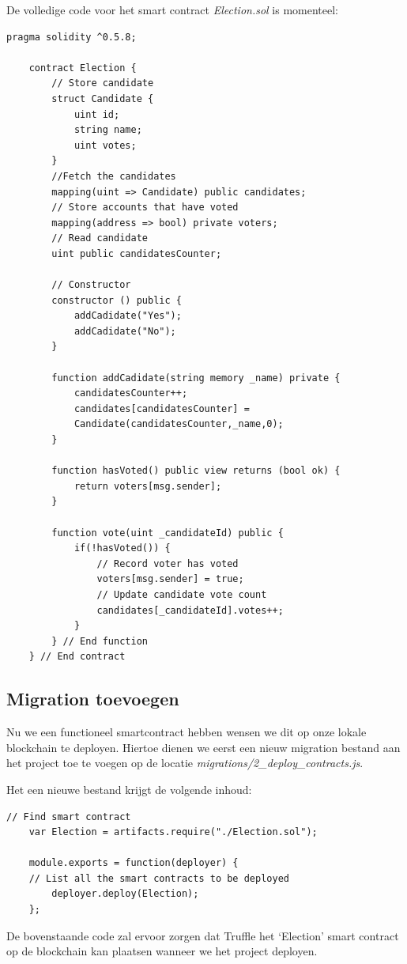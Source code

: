 	De volledige code voor het smart contract \textit{Election.sol} is momenteel:
	
	\lstset{language=JavaScriptSolidity} 
	\begin{lstlisting}[frame=single,  label={lst:election}] 
	pragma solidity ^0.5.8;
	
	contract Election {
		// Store candidate
		struct Candidate {
			uint id;
			string name;
			uint votes;
		}
		//Fetch the candidates
		mapping(uint => Candidate) public candidates;
		// Store accounts that have voted
		mapping(address => bool) private voters;
		// Read candidate
		uint public candidatesCounter;
		
		// Constructor
		constructor () public {
			addCadidate("Yes");
			addCadidate("No");
		}
	
		function addCadidate(string memory _name) private {
			candidatesCounter++;
			candidates[candidatesCounter] = 
			Candidate(candidatesCounter,_name,0);
		}
		
		function hasVoted() public view returns (bool ok) {
			return voters[msg.sender];
		}
		
		function vote(uint _candidateId) public {
			if(!hasVoted()) {
				// Record voter has voted
				voters[msg.sender] = true;
				// Update candidate vote count
				candidates[_candidateId].votes++;
			}
		} // End function
	} // End contract
	\end{lstlisting}
	
	
	\subsection{Migration toevoegen}
	Nu we een functioneel smartcontract hebben wensen we dit op onze lokale blockchain te deployen. Hiertoe dienen we  eerst een nieuw migration bestand aan het project toe te voegen op de locatie \textit{migrations\slash 2\_deploy\_contracts.js}.  
	
	Het een nieuwe bestand krijgt de volgende inhoud:
	
	\begin{lstlisting}[frame=single]
	// Find smart contract
	var Election = artifacts.require("./Election.sol");
	
	module.exports = function(deployer) {
	// List all the smart contracts to be deployed
		deployer.deploy(Election);
	};
	\end{lstlisting}
	
	De bovenstaande code zal ervoor zorgen dat Truffle  het `Election' smart contract op de blockchain kan plaatsen wanneer we het project deployen.
	
